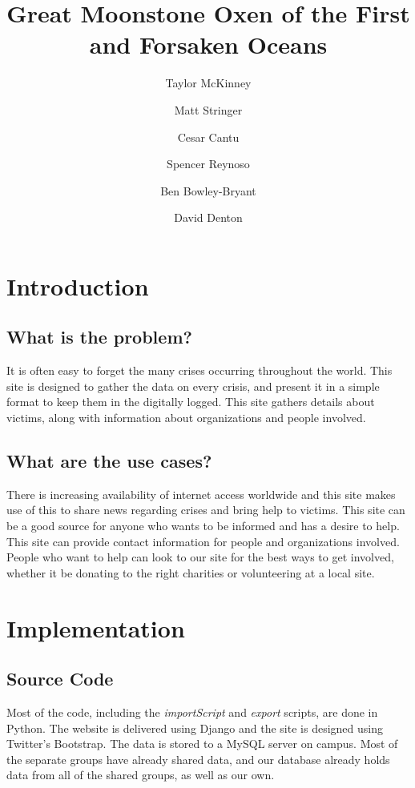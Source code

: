\documentclass[12pt]{report}
\title{Great Moonstone Oxen of the First and Forsaken Oceans}
\author{
    Taylor McKinney
    \and Matt Stringer
    \and Cesar Cantu
    \and Spencer Reynoso
    \and Ben Bowley-Bryant
    \and David Denton}
\begin{document}
\maketitle

\section*{Introduction}
\subsection*{What is the problem?}
\hfill


It is often easy to forget the many crises occurring throughout the world.
This site is designed to gather the data on every crisis, and present it in a simple format to keep them in the digitally logged.
This site gathers details about victims, along with information about organizations and people involved.

\subsection*{What are the use cases?}
\hfill


There is increasing availability of internet access worldwide and this site makes use of this to share news regarding crises and bring help to victims.
This site can be a good source for anyone who wants to be informed and has a desire to help. 
This site can provide contact information for people and organizations involved.
People who want to help can look to our site for the best ways to get involved, whether it be donating to the right charities or volunteering at a local site.


\newpage
\section*{Implementation}
\hfill


\subsection*{Source Code}
\hfill


Most of the code, including the \emph{importScript} and \emph{export} scripts, are done in Python.
The website is delivered using Django and the site is designed using Twitter's Bootstrap.
The data is stored to a MySQL server on campus.
Most of the separate groups have already shared data,
and our database already holds data from all of the shared groups, as well as our own.\\
\end{document}
